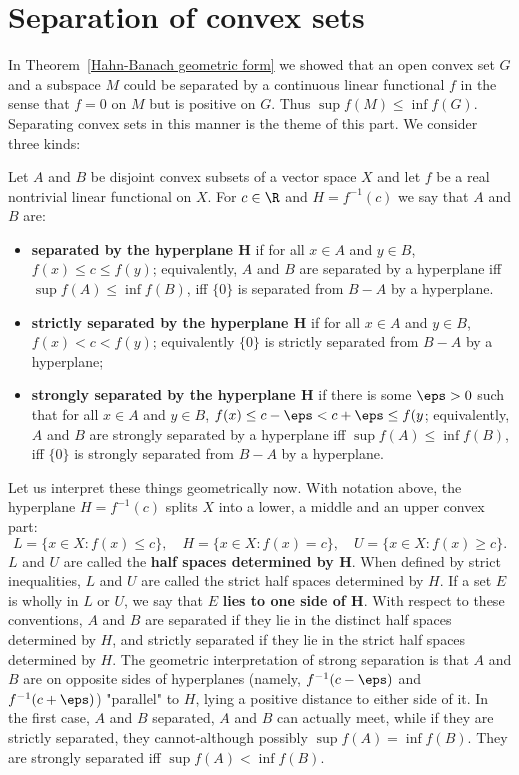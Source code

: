 \section{Separation of convex sets}
In Theorem~\ref{Hahn-Banach geometric form} we showed that an open convex set $G$ and a subspace $M$ could be separated by a continuous linear functional $f$ in the sense that $f=0$ on $M$ but is positive on $G$. Thus $\sup f(M)\leq\inf f(G)$. Separating convex sets in this manner is the theme of this part. We consider three kinds:
\begin{definition}
Let $A$ and $B$ be disjoint convex subsets of a vector space $X$ and let $f$ be a real nontrivial linear functional on $X$. For $c\in\R$ and $H=f^{-1}(c)$ we say that $A$ and $B$ are:
\begin{itemize}
\item \textbf{separated by the hyperplane $\bm{H}$} if for all $x\in A$ and $y\in B$, $f(x)\leq c\leq f(y)$; equivalently, $A$ and $B$ are separated by a hyperplane iff $\sup f(A)\leq\inf f(B)$, iff $\{0\}$ is separated from $B-A$ by a hyperplane.
\item \textbf{strictly separated by the hyperplane $\bm{H}$} if for all $x\in A$ and $y\in B$, $f(x)<c<f(y)$; equivalently $\{0\}$ is strictly separated from $B-A$ by a hyperplane;
\item \textbf{strongly separated by the hyperplane $\bm{H}$} if there is some $\eps>0$ such that for all $x\in A$ and $y\in B$, $f(x)\leq c-\eps<c+\eps\leq f(y$; equivalently, $A$ and $B$ are strongly separated by a hyperplane iff $\sup f(A)\leq\inf f(B)$, iff $\{0\}$ is strongly separated from $B-A$ by a hyperplane.
\end{itemize}
\end{definition}
Let us interpret these things geometrically now. With notation above, the hyperplane $H=f^{-1}(c)$ splits $X$ into a lower, a middle and an upper convex part:
\[L=\{x\in X:f(x)\leq c\},\quad H=\{x\in X:f(x)=c\},\quad U=\{x\in X:f(x)\geq c\}.\]
$L$ and $U$ are called the \textbf{half spaces determined by $\bm{H}$}. When defined by strict inequalities, $L$ and $U$ are called the strict half spaces determined by $H$. If a set $E$ is wholly in $L$ or $U$, we say that $E$ \textbf{lies to one side of $\bm{H}$}. With respect to these conventions, $A$ and $B$ are separated if they lie in the distinct half spaces determined by $H$, and strictly separated if they lie in the strict half spaces determined by $H$. The geometric interpretation of strong separation is that $A$ and $B$ are on opposite sides of hyperplanes (namely, $f^{-1}(c-\eps)$ and $f^{-1}(c+\eps)$) "parallel" to $H$, lying a positive distance to either side of it. In the first case, $A$ and $B$ separated, $A$ and $B$ can actually meet, while if they are strictly separated, they cannot-although possibly $\sup f(A)=\inf f(B)$. They are strongly separated iff $\sup f(A)<\inf f(B)$.\par
